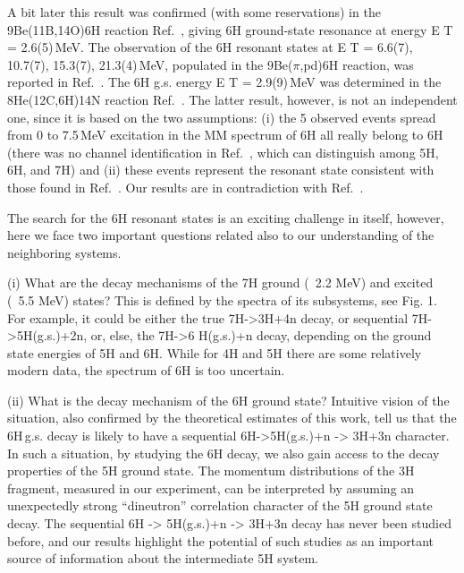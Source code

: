 \newpage

A bit later this result was confirmed (with some reservations) in the 9Be(11B,14O)6H reaction Ref.\ \cite{Belozyorov:1986}, giving 6H ground-state resonance at energy E T = 2.6(5)\,MeV. 
The observation of the 6H resonant states at E T = {6.6(7), 10.7(7), 15.3(7), 21.3(4)}\,MeV, populated in the 9Be($\pi$,pd)6H reaction, was reported in Ref.\ \cite{Gurov:2007}. 
The 6H g.s. energy E T = 2.9(9)\,MeV was determined in the 8He(12C,6H)14N reaction Ref.\ \cite{Caamano:2008}. 
The latter result, however, is not an independent one, since it is based on the two assumptions: (i) the 5 observed events spread from 0 to 7.5\,MeV excitation in the MM spectrum of 6H all really belong to 6H (there was no channel identification in Ref.\ \cite{Caamano:2008}, which can distinguish among 5H, 6H, and 7H) and (ii) these events represent the resonant state consistent with those found in Ref.\ \cite{Aleksandrov:1984,Belozyorov:1986}.
Our results are in contradiction with Ref.\ \cite{Aleksandrov:1984,Belozyorov:1986,Caamano:2008}.

The search for the 6H resonant states is an exciting challenge in itself, however, here we face two important questions related also to our understanding of the neighboring systems.

(i) What are the decay mechanisms of the 7H ground (~2.2 MeV) and excited (~5.5 MeV) states? 
This is defined by the spectra of its subsystems, see Fig. 1. For example, it could be either the true 7H->3H+4n decay, or sequential 7H->5H(g.s.)+2n, or, else, the 7H->6 H(g.s.)+n decay, depending on the ground state energies of 5H and 6H. 
While for 4H and 5H there are some relatively modern data, the spectrum of 6H is too uncertain.

(ii) What is the decay mechanism of the 6H ground state?
Intuitive vision of the situation, also confirmed by the theoretical estimates of this work, tell us that the 6H\,g.s. decay is likely to have a sequential 6H->5H(g.s.)+n -> 3H+3n character. 
In such a situation, by studying the 6H decay, we also gain access to the decay properties of the 5H ground state.
The momentum distributions of the 3H fragment, measured in our experiment, can be interpreted by assuming an unexpectedly strong “dineutron” correlation character of the 5H ground state decay. 
The sequential 6H -> 5H(g.s.)+n -> 3H+3n decay has never been studied before, and our results highlight the potential of such studies as an important source of information about the intermediate 5H system.
